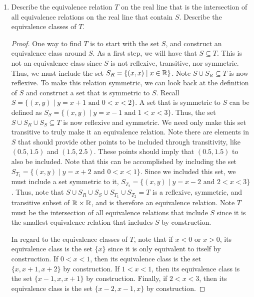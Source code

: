 \documentclass[12pt]{article}
\begin{document}
\begin{enumerate}[label=(\alph*)]
	\item Describe the equivalence relation $T$ on the real line that is the intersection
	of all equivalence relations on the real line that contain $S$. Describe the 
	equivalence classes of $T$.
	
	\begin{proof}
		One way to find $T$ is to start with the set $S$, and construct an equivalence class around
		$S$. As a first step, we will have that $S \subseteq T$. This is not an equivalence class
		since $S$ is not reflexive, transitive, nor symmetric. Thus, we must include the set
		$S_R = \{(x, x) \mid x \in \mathbb{R}\}$. Note $S \cup S_R \subseteq T$ is now reflexive.
		To make this relation symmetric, we can look back at the definition of $S$ and construct
		a set that is symmetric to $S$. Recall $S = \{(x, y) \mid y = x + 1 \text{ and } 0 < x < 2\}$.
		A set that is symmetric to $S$ can be defined as $S_S = \{(x, y) \mid y = x - 1 \text{ and }
		1 < x < 3\}$. Thus, the set $S \cup S_R \cup S_S \subseteq T$ is now reflexive and symmetric.
		We need only make this set transitive to truly make it an equivalence relation.
		Note there are elements in $S$ that should provide other points to be included through transitivity,
		like $(0.5, 1.5)$ and $(1.5, 2.5)$. These points should imply that $(0.5, 1.5)$ to also be 
		included. Note that this can be accomplished by including the set $S_{T_1} = \{(x, y)
		\mid y = x + 2 \text{ and } 0 < x < 1\}$. Since we included this set, we must include
		a set symmetric to it, $S_{T_2} = \{(x, y) \mid y = x - 2 \text{ and } 2 < x < 3\}$.
		Thus, note that $S \cup S_R \cup S_S \cup S_{T_1} \cup S_{T_2} = T$ is a reflexive, symmetric,
		and transitive subset of $\mathbb{R} \times \mathbb{R}$, and is therefore an equivalence relation. Note $T$
		must be the intersection of all equivalence relations that include $S$ since it is the 
		smallest equivalence relation that includes $S$ by construction.
		
		In regard to the equivalence classes of $T$, note that if $x < 0$ or $x > 0$, its equivalence
		class is the set $\{x\}$ since it is only equivalent to itself by construction. If 
		$0 < x < 1$, then its equivalence class is the set $\{x, x+1, x+2\}$ by construction.
		If $1 < x < 1$, then its equivalence class is the set $\{x-1, x, x+1\}$ by construction.
		Finally, if $2 < x < 3$, then its equivalence class is the set $\{x-2, x-1, x\}$ by construction.
	\end{proof}
	
\end{enumerate}
\end{document}
